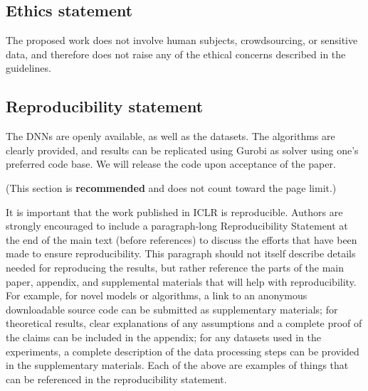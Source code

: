 \documentclass{article} %
\begin{document}
\subsection*{Ethics statement}

The proposed work does not involve human subjects, crowdsourcing, or sensitive data, and therefore does not raise any of the ethical concerns described in the guidelines.

\subsection*{Reproducibility statement}

The DNNs are openly available, as well as the datasets. The algorithms are clearly provided, and results can be replicated using Gurobi as solver using one's preferred code base. We will release the code upon acceptance of the paper.

\iffalse
(This section is \textbf{recommended} and does not count toward the page limit.)

It is important that the work published in ICLR is reproducible. Authors are
strongly encouraged to include a paragraph-long Reproducibility Statement at the
end of the main text (before references) to discuss the efforts that have been
made to ensure reproducibility. This paragraph should not itself describe
details needed for reproducing the results, but rather reference the parts of
the main paper, appendix, and supplemental materials that will help with
reproducibility. For example, for novel models or algorithms, a link to an
anonymous downloadable source code can be submitted as supplementary materials;
for theoretical results, clear explanations of any assumptions and a complete
proof of the claims can be included in the appendix; for any datasets used in
the experiments, a complete description of the data processing steps can be
provided in the supplementary materials. Each of the above are examples of
things that can be referenced in the reproducibility statement.
\end{document}
